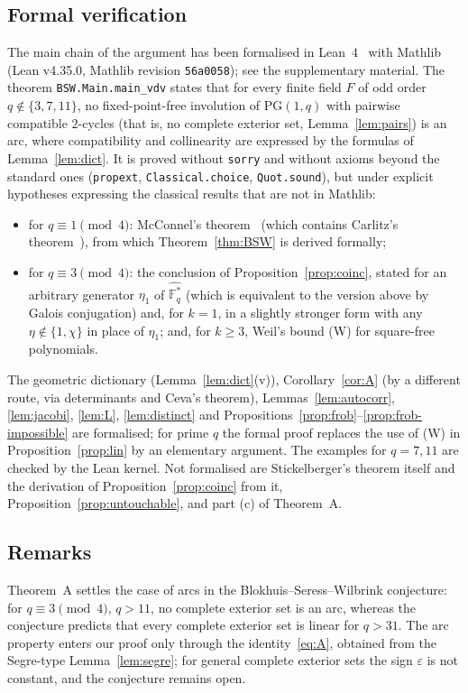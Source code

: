 \documentclass[11pt]{amsart}
\theoremstyle{definition}
\theoremstyle{remark}
\numberwithin{equation}{section}
\newcommand{\Fs}{\mathbb{F}_q^{*}}
\newcommand{\PGone}{\mathrm{PG}(1,q)}
\begin{document}
\subsection{Formal verification}
The main chain of the argument has been formalised in Lean~4~\cite{Lean4} with Mathlib~\cite{Mathlib} (Lean v4.35.0, Mathlib
revision \texttt{56a0058}); see the supplementary material. The theorem \texttt{BSW.Main.main\_vdv} states that for every finite field
$F$ of odd order $q\notin\{3,7,11\}$, no fixed-point-free involution of $\PGone$ with pairwise compatible $2$-cycles (that is, no
complete exterior set, Lemma~\ref{lem:pairs}) is an arc, where compatibility and collinearity are expressed by the formulas of
Lemma~\ref{lem:dict}. It is proved without \texttt{sorry} and without axioms beyond the standard ones (\texttt{propext},
\texttt{Classical.choice}, \texttt{Quot.sound}), but under explicit hypotheses expressing the classical results that are not in
Mathlib:
\begin{itemize}
\item for $q\equiv1\pmod4$: McConnel's theorem~\cite{McConnel} (which contains Carlitz's theorem~\cite{Carlitz}), from which
Theorem~\ref{thm:BSW} is derived formally;
\item for $q\equiv3\pmod4$: the conclusion of Proposition~\ref{prop:coinc}, stated for an arbitrary generator $\eta_1$ of
$\widehat{\Fs}$ (which is equivalent to the version above by Galois conjugation) and, for $k=1$, in a slightly stronger form
with any $\eta\notin\{1,\chi\}$ in place of $\eta_1$; and, for $k\ge3$, Weil's bound (W) for square-free polynomials.
\end{itemize}
The geometric dictionary (Lemma~\ref{lem:dict}(v)), Corollary~\ref{cor:A} (by a different route, via determinants and Ceva's
theorem), Lemmas~\ref{lem:autocorr}, \ref{lem:jacobi}, \ref{lem:L}, \ref{lem:distinct} and
Propositions~\ref{prop:frob}--\ref{prop:frob-impossible} are formalised; for prime $q$ the formal proof replaces the use of (W) in
Proposition~\ref{prop:lin} by an elementary argument. The examples for $q=7,11$ are checked by the Lean kernel. Not formalised are
Stickelberger's theorem itself and the derivation of Proposition~\ref{prop:coinc} from it, Proposition~\ref{prop:untouchable}, and
part (c) of Theorem~A.

\subsection{Remarks}
Theorem~A settles the case of arcs in the Blokhuis--Seress--Wilbrink conjecture: for $q\equiv3\pmod4$, $q>11$, no complete
exterior set is an arc, whereas the conjecture predicts that every complete exterior set is linear for $q>31$. The arc property
enters our proof only through the identity~\eqref{eq:A}, obtained from the Segre-type Lemma~\ref{lem:segre}; for general complete
exterior sets the sign $\varepsilon$ is not constant, and the conjecture remains open.
\end{document}
